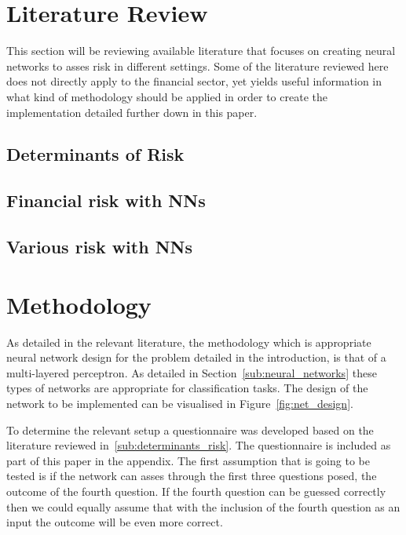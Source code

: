 \documentclass{article}
\begin{document}
\section{Literature Review}
\label{sec:literature_review}
This section will be reviewing available literature that focuses on creating neural networks to asses risk in different settings. Some of the literature reviewed here does not directly apply to the financial sector, yet yields useful information in what kind of methodology should be applied in order to create the implementation detailed further down in this paper.

\subsection{Determinants of Risk}
\label{sub:determinants_riks}


\subsection{Financial risk with NNs}
\label{sub:financial_risk_nn}


\subsection{Various risk with NNs}
\label{sub:various_risk_nn}

\section{Methodology}
\label{sec:methodology}

As detailed in the relevant literature, the methodology which is appropriate neural network design for the problem detailed in the introduction, is that of a multi-layered perceptron. As detailed in Section~\ref{sub:neural_networks} these types of networks are appropriate for classification tasks. The design of the network to be implemented can be visualised in Figure~\ref{fig:net_design}. 

To determine the relevant setup a questionnaire was developed based on the literature reviewed in~\ref{sub:determinants_risk}. The questionnaire is included as part of this paper in the appendix. The first assumption that is going to be tested is if the network can asses through the first three questions posed, the outcome of the fourth question. If the fourth question can be guessed correctly then we could equally assume that with the inclusion of the fourth question as an input the outcome will be even more correct. 
\end{document}
